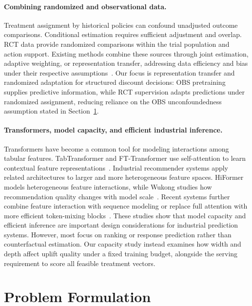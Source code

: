\documentclass[sigconf,nonacm]{acmart}
\begin{document}
\paragraph{Combining randomized and observational data.}
Treatment assignment by historical policies can confound unadjusted outcome comparisons. Conditional estimation requires sufficient adjustment and overlap. RCT data provide randomized comparisons within the trial population and action support. Existing methods combine these sources through joint estimation, adaptive weighting, or representation transfer, addressing data efficiency and bias under their respective assumptions~\cite{wu2022integrative,cheng2021adaptive,hatt2022combining,triantafillou2023learning,degtiar2023combining}. Our focus is representation transfer and randomized adaptation for structured discount decisions: OBS pretraining supplies predictive information, while RCT supervision adapts predictions under randomized assignment, reducing reliance on the OBS unconfoundedness assumption stated in Section~\ref{sec:problem}.

\paragraph{Transformers, model capacity, and efficient industrial inference.}
Transformers have become a common tool for modeling interactions among tabular features. TabTransformer and FT-Transformer use self-attention to learn contextual feature representations~\cite{huang2020tabtransformer,gorishniy2021revisiting}. Industrial recommender systems apply related architectures to larger and more heterogeneous feature spaces. HiFormer models heterogeneous feature interactions, while Wukong studies how recommendation quality changes with model scale~\cite{gui2023hiformer,zhang2024wukong}. Recent systems further combine feature interaction with sequence modeling or replace full attention with more efficient token-mixing blocks~\cite{zhang2025onetrans,zhu2025rankmixer,jiang2026tokenmixer,ha2026unimixer,cai2026whale}. These studies show that model capacity and efficient inference are important design considerations for industrial prediction systems. However, most focus on ranking or response prediction rather than counterfactual estimation. Our capacity study instead examines how width and depth affect uplift quality under a fixed training budget, alongside the serving requirement to score all feasible treatment vectors.

\section{Problem Formulation}
\label{sec:problem}
\end{document}
